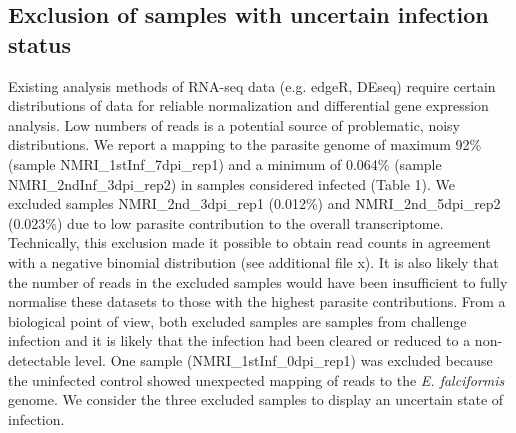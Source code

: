 \documentclass{bmcart}
\begin{document}
\subsection*{Exclusion of samples with uncertain infection status}
Existing analysis methods of RNA-seq data (e.g. edgeR, DEseq) require certain distributions of data for reliable normalization and differential gene expression analysis. Low numbers of reads is a potential source of problematic, noisy distributions. We report a mapping to the parasite genome of maximum 92\% (sample NMRI\_1stInf\_7dpi\_rep1) and a minimum of 0.064\% (sample NMRI\_2ndInf\_3dpi\_rep2) in samples considered infected (Table 1). We excluded samples NMRI\_2nd\_3dpi\_rep1 (0.012\%) and NMRI\_2nd\_5dpi\_rep2 (0.023\%) due to low parasite contribution to the overall transcriptome. Technically, this exclusion made it possible to obtain read counts in agreement with a negative binomial distribution (see additional file x). It is also likely that the number of reads in the excluded samples would have been insufficient to fully normalise these datasets to those with the highest parasite contributions. From a biological point of view, both excluded samples are samples from challenge infection and it is likely that the infection had been cleared or reduced to a non-detectable level. One sample (NMRI\_1stInf\_0dpi\_rep1) was excluded because the uninfected control showed unexpected mapping of reads to the \textit{E. falciformis} genome. We consider the three excluded samples to display an uncertain state of infection.
\end{document}
